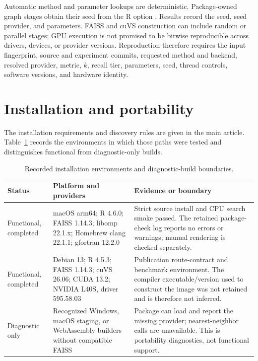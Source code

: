 \documentclass[11pt]{article}
\begin{document}
Automatic method and parameter lookups are deterministic. Package-owned graph stages obtain their
seed from the R option . Results record the seed,
seed provider, and parameters. FAISS and cuVS construction can include random
or parallel stages; GPU execution is not promised to be bitwise reproducible
across drivers, devices, or provider versions. Reproduction therefore
requires the input fingerprint, source and experiment commits, requested
method and backend, resolved provider, metric, $k$, recall tier, parameters,
seed, thread controls, software versions, and hardware identity.

\section{Installation and portability}
\label{sec:supp-installation}

The installation requirements and discovery rules are given in the main
article. Table~\ref{tab:install-matrix} records the environments in which those
paths were tested and distinguishes functional from diagnostic-only builds.

\begin{table}[H]
\centering

\small
\begin{tabularx}{\textwidth}{@{}p{}p{}X@{}}
\toprule
Status & Platform and providers & Evidence or boundary \\
\midrule
Functional, completed & macOS arm64; R 4.6.0; FAISS 1.14.3; libomp 22.1.x; Homebrew clang 22.1.1; gfortran 12.2.0 & Strict source install and CPU search smoke passed. The retained package-check log reports no errors or warnings; manual rendering is checked separately. \\
Functional, completed & Debian 13; R 4.5.3; FAISS 1.14.3; cuVS 26.06; CUDA 13.2; NVIDIA L40S, driver 595.58.03 & Publication route-contract and benchmark environment. The compiler executable/version used to construct the image was not retained and is therefore not inferred. \\
Diagnostic only & Recognized Windows, macOS staging, or WebAssembly builders without compatible FAISS & Package can load and report the missing provider; nearest-neighbor calls are unavailable. This is portability diagnostics, not functional support. \\
\bottomrule
\end{tabularx}
\caption{Recorded installation environments and diagnostic-build boundaries.}
\label{tab:install-matrix}
\end{table}
\end{document}
